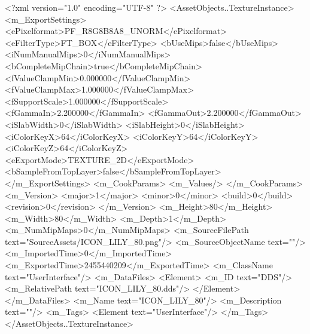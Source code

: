 <?xml version="1.0" encoding="UTF-8" ?>
<AssetObjects..TextureInstance>
	<m_ExportSettings>
		<ePixelformat>PF_R8G8B8A8_UNORM</ePixelformat>
		<eFilterType>FT_BOX</eFilterType>
		<bUseMips>false</bUseMips>
		<iNumManualMips>0</iNumManualMips>
		<bCompleteMipChain>true</bCompleteMipChain>
		<fValueClampMin>0.000000</fValueClampMin>
		<fValueClampMax>1.000000</fValueClampMax>
		<fSupportScale>1.000000</fSupportScale>
		<fGammaIn>2.200000</fGammaIn>
		<fGammaOut>2.200000</fGammaOut>
		<iSlabWidth>0</iSlabWidth>
		<iSlabHeight>0</iSlabHeight>
		<iColorKeyX>64</iColorKeyX>
		<iColorKeyY>64</iColorKeyY>
		<iColorKeyZ>64</iColorKeyZ>
		<eExportMode>TEXTURE_2D</eExportMode>
		<bSampleFromTopLayer>false</bSampleFromTopLayer>
	</m_ExportSettings>
	<m_CookParams>
		<m_Values/>
	</m_CookParams>
	<m_Version>
		<major>1</major>
		<minor>0</minor>
		<build>0</build>
		<revision>0</revision>
	</m_Version>
	<m_Height>80</m_Height>
	<m_Width>80</m_Width>
	<m_Depth>1</m_Depth>
	<m_NumMipMaps>0</m_NumMipMaps>
	<m_SourceFilePath text="SourceAssets/ICON_LILY_80.png"/>
	<m_SourceObjectName text=""/>
	<m_ImportedTime>0</m_ImportedTime>
	<m_ExportedTime>2455440209</m_ExportedTime>
	<m_ClassName text="UserInterface"/>
	<m_DataFiles>
		<Element>
			<m_ID text="DDS"/>
			<m_RelativePath text="ICON_LILY_80.dds"/>
		</Element>
	</m_DataFiles>
	<m_Name text="ICON_LILY_80"/>
	<m_Description text=""/>
	<m_Tags>
		<Element text="UserInterface"/>
	</m_Tags>
</AssetObjects..TextureInstance>

